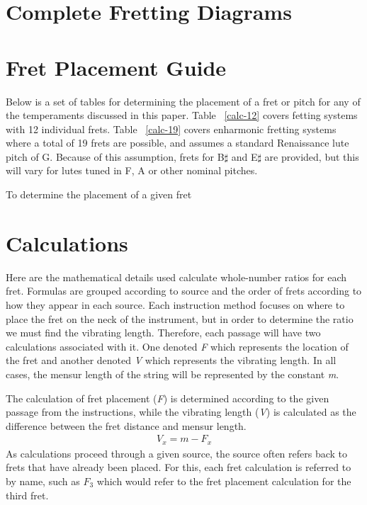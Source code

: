 \appendix

\chapter{Complete Fretting Diagrams}





\chapter{Fret Placement Guide}

Below is a set of tables for determining the placement of a fret or pitch for any of the 
temperaments discussed in this paper. Table ~\ref{calc-12} covers fetting systems with
12 individual frets.  Table ~\ref{calc-19} covers enharmonic fretting systems where
a total of 19 frets are possible, and assumes a standard Renaissance lute pitch of
G.  Because of this assumption, frets for B$\sharp$ and E$\sharp$ are provided, but
this will vary for lutes tuned in F, A or other nominal pitches.

To determine the placement of a given fret 





\chapter{Calculations}

Here are the mathematical details used calculate whole-number ratios for each fret.
Formulas are grouped according to source and the order of frets according to how they
appear in each source.  Each instruction method focuses on where to place the fret on
the neck of the instrument, but in order to determine the ratio we must find the
vibrating length. Therefore, each passage will have two calculations associated with
it.  One denoted \textit{F} which represents the location of the fret and another
denoted \textit{V} which represents the vibrating length.  In all cases, the mensur
length of the string will be represented by the constant \textit{m}.

The calculation of fret placement (\textit{F}) is determined according to the given
passage from the instructions, while the vibrating length (\textit{V}) is calculated as
the difference between the fret distance and mensur length.
\begin{eqnarray*}
    V_x = m - F_x
\end{eqnarray*}
As calculations proceed through a given source, the source often refers back to frets
that have already been placed.  For this, each fret calculation is referred to by name,
such as $F_{3}$ which would refer to the fret placement calculation for the third fret.

